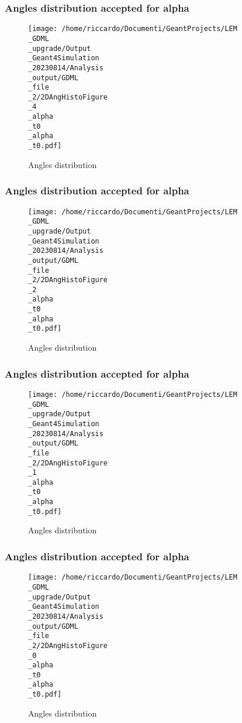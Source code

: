 \documentclass[8pt]{beamer}
\begin{document}
            \begin{frame}
                \frametitle{Angles distribution accepted for alpha}
            
        \begin{figure}[h]
            \centering
            \texttt{[image: /home/riccardo/Documenti/GeantProjects/LEM\\\_GDML\\\_upgrade/Output\\\_Geant4Simulation\\\_20230814/Analysis\\\_output/GDML\\\_file\\\_2/2DAngHistoFigure\\\_4\\\_alpha\\\_t0\\\_alpha\\\_t0.pdf]}
            \caption{Angles distribution}
        \end{figure}
        
            \end{frame}
            
            \begin{frame}
                \frametitle{Angles distribution accepted for alpha}
            
        \begin{figure}[h]
            \centering
            \texttt{[image: /home/riccardo/Documenti/GeantProjects/LEM\\\_GDML\\\_upgrade/Output\\\_Geant4Simulation\\\_20230814/Analysis\\\_output/GDML\\\_file\\\_2/2DAngHistoFigure\\\_2\\\_alpha\\\_t0\\\_alpha\\\_t0.pdf]}
            \caption{Angles distribution}
        \end{figure}
        
            \end{frame}
            
            \begin{frame}
                \frametitle{Angles distribution accepted for alpha}
            
        \begin{figure}[h]
            \centering
            \texttt{[image: /home/riccardo/Documenti/GeantProjects/LEM\\\_GDML\\\_upgrade/Output\\\_Geant4Simulation\\\_20230814/Analysis\\\_output/GDML\\\_file\\\_2/2DAngHistoFigure\\\_1\\\_alpha\\\_t0\\\_alpha\\\_t0.pdf]}
            \caption{Angles distribution}
        \end{figure}
        
            \end{frame}
            
            \begin{frame}
                \frametitle{Angles distribution accepted for alpha}
            
        \begin{figure}[h]
            \centering
            \texttt{[image: /home/riccardo/Documenti/GeantProjects/LEM\\\_GDML\\\_upgrade/Output\\\_Geant4Simulation\\\_20230814/Analysis\\\_output/GDML\\\_file\\\_2/2DAngHistoFigure\\\_0\\\_alpha\\\_t0\\\_alpha\\\_t0.pdf]}
            \caption{Angles distribution}
        \end{figure}
        
            \end{frame}
            
\end{document}
